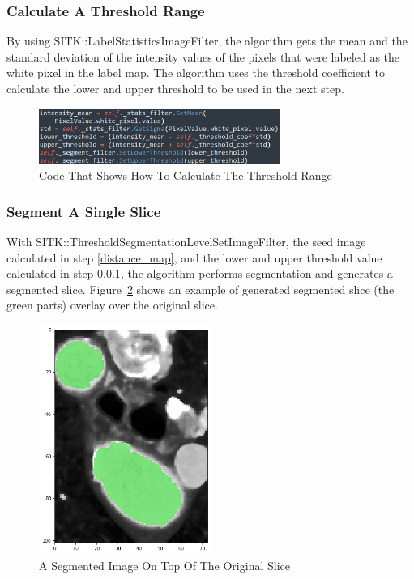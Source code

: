 \subsubsection{Calculate A Threshold Range} \label{threshold}
By using SITK::LabelStatisticsImageFilter, the algorithm gets the mean and the standard deviation of the intensity values of the pixels that were labeled as the white pixel in the label map. The algorithm uses the threshold coefficient to calculate the lower and upper threshold to be used in the next step.

\begin{figure}[H]
    \centering
    \includegraphics[width=0.7\textwidth]{figures/AGR/threshold.png}
    \caption[Code That Shows How To Calculate The Threshold Range]{Code That Shows How To Calculate The Threshold Range}
    \label{fig_threshold}
\end{figure}

\subsubsection{Segment A Single Slice}\label{segment}
With SITK::ThresholdSegmentationLevelSetImageFilter, the seed image calculated in step \ref{distance_map}, and the lower and upper threshold value calculated in step \ref{threshold}, the algorithm performs segmentation and generates a segmented slice. Figure~\ref{fig_segmented_image} shows an example of generated segmented slice (the green parts) overlay over the original slice.

\begin{figure}[H]
    \centering
    \includegraphics[width=0.5\textwidth]{figures/AGR/segment_label_image.png}
    \caption[A Segmented Image]{A Segmented Image On Top Of The Original Slice}
    \label{fig_segmented_image}
\end{figure}

